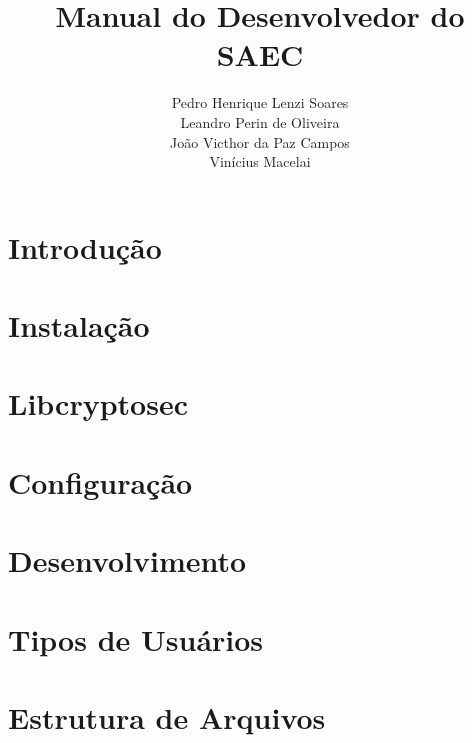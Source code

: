 \documentclass{packages/labsec_planos}
\begin{document}
\title{Manual do Desenvolvedor do SAEC}
\author{Pedro Henrique Lenzi Soares \\ Leandro Perin de Oliveira \\ João Victhor da Paz Campos \\ Vinícius Macelai}
\dataDocumento{\today}

\maketitle

\clearpage

\tableofcontents

\chapter{Introdução}


\chapter{Instalação}


\chapter{Libcryptosec}


\chapter{Configuração}


\chapter{Desenvolvimento}


\chapter{Tipos de Usuários}


\chapter{Estrutura de Arquivos}

\end{document}
